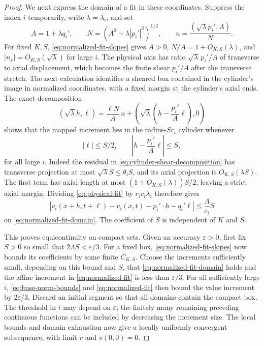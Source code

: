 \documentclass[11pt]{article}
\numberwithin{equation}{section}
\theoremstyle{definition}
\theoremstyle{remark}
\begin{document}
\begin{proof}
We next express the domain of a fit in these coordinates. Suppress the index $i$ temporarily, write $\lambda=\lambda_i$, and set
\[
  A=1+\lambda q_i',\qquad N=(A^2+\lambda|p_i'|^2)^{1/2},
  \qquad n=\frac{(\sqrt\lambda p_i',A)}{N}.
\]
For fixed $K,S$, \eqref{eq:normalized-fit-slopes} gives $A>0$, $N/A=1+O_{K,S}(\lambda)$, and $|n_x|=O_{K,S}(\sqrt\lambda)$ for large $i$. The physical axis has ratio $\sqrt\lambda\,p_i'/A$ of transverse to axial displacement, which becomes the finite shear $p_i'/A$ after the transverse stretch. The next calculation identifies a sheared box contained in the cylinder's image in normalized coordinates, with a fixed margin at the cylinder's axial ends. The exact decomposition
\begin{equation}\label{eq:cylinder-shear-decomposition}
  (\sqrt\lambda h,\ell)
   =\frac{\ell N}{A}\,n
       +\left(\sqrt\lambda\left(h-\frac{p_i'}A\ell\right),0\right)
\end{equation}
shows that the mapped increment lies in the radius-$Sr_i$ cylinder whenever
\begin{equation}\label{eq:normalized-fit-domain}
  |\ell|\le S/2,\qquad \left|h-\frac{p_i'}A\ell\right|\le S,
\end{equation}
for all large $i$. Indeed the residual in \eqref{eq:cylinder-shear-decomposition} has transverse projection at most $\sqrt\lambda S\le\theta_i S$, and its axial projection is $O_{K,S}(\lambda S)$. The first term has axial length at most $(1+O_{K,S}(\lambda))S/2$, leaving a strict axial margin. Dividing \eqref{eq:physical-fit} by $r_i c_i\lambda_i$ therefore gives
\begin{equation}\label{eq:normalized-fit}
  |v_i(x+h,t+\ell)-v_i(x,t)-p_i'\cdot h-q_i'\ell|
      \le\frac{\Lambda}{c_i}S
\end{equation}
on \eqref{eq:normalized-fit-domain}. The coefficient of $S$ is independent of $K$ and $S$.



This proves equicontinuity on compact sets. Given an accuracy $\varepsilon>0$, first fix $S>0$ so small that $2\Lambda S<\varepsilon/3$. For a fixed box, \eqref{eq:normalized-fit-slopes} now bounds its coefficients by some finite $C_{K,S}$. Choose the increments sufficiently small, depending on this bound and $S$, that \eqref{eq:normalized-fit-domain} holds and the affine increment in \eqref{eq:normalized-fit} is less than $\varepsilon/3$. For all sufficiently large $i$, \eqref{eq:base-norm-bounds} and \eqref{eq:normalized-fit} then bound the value increment by $2\varepsilon/3$. Discard an initial segment so that all domains contain the compact box. The threshold in $i$ may depend on $\varepsilon$; the finitely many remaining preceding continuous functions can be included by decreasing the increment size. The local bounds and domain exhaustion now give a locally uniformly convergent subsequence, with limit $v$ and $v(0,0)=0$.


\end{proof}
\end{document}
